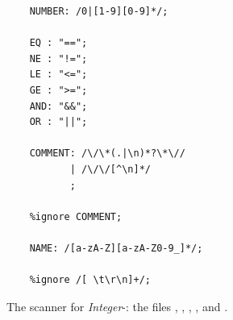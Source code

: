 \begin{figure}[!ht]
\centering
\begin{verbatim}
    NUMBER: /0|[1-9][0-9]*/;

    EQ : "==";
    NE : "!=";
    LE : "<=";
    GE : ">=";
    AND: "&&";
    OR : "||";

    COMMENT: /\/\*(.|\n)*?\*\//
           | /\/\/[^\n]*/
           ;

    %ignore COMMENT;

    NAME: /[a-zA-Z][a-zA-Z0-9_]*/;

    %ignore /[ \t\r\n]+/;
\end{verbatim}
\vspace*{-0.3cm}
\caption{The scanner for \textsl{Integer}-:  the files , ,
         , , and .}
\label{fig:Compiler.ipynb:lex}
\end{figure}

